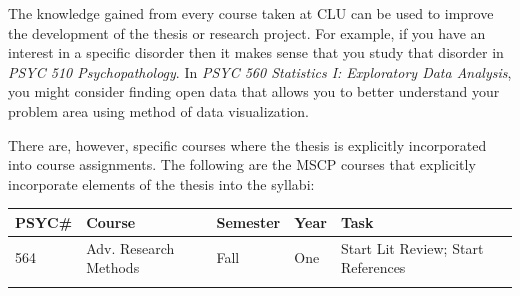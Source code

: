 \documentclass[
  openany]{book}
\begin{document}
The knowledge gained from every course taken at CLU can be used to improve the development of the thesis or research project. For example, if you have an interest in a specific disorder then it makes sense that you study that disorder in \emph{PSYC 510 Psychopathology}. In \emph{PSYC 560 Statistics I: Exploratory Data Analysis}, you might consider finding open data that allows you to better understand your problem area using method of data visualization.

There are, however, specific courses where the thesis is explicitly incorporated into course assignments. The following are the MSCP courses that explicitly incorporate elements of the thesis into the syllabi:

\begin{longtable}[]{@{}lllll@{}}
\toprule
\begin{minipage}[b]{0.03\columnwidth}\raggedright
PSYC\#\strut
\end{minipage} & \begin{minipage}[b]{0.27\columnwidth}\raggedright
Course\strut
\end{minipage} & \begin{minipage}[b]{0.26\columnwidth}\raggedright
Semester\strut
\end{minipage} & \begin{minipage}[b]{0.10\columnwidth}\raggedright
Year\strut
\end{minipage} & \begin{minipage}[b]{0.19\columnwidth}\raggedright
Task\strut
\end{minipage}\tabularnewline
\midrule
\endhead
\begin{minipage}[t]{0.03\columnwidth}\raggedright
564\strut
\end{minipage} & \begin{minipage}[t]{0.27\columnwidth}\raggedright
Adv. Research Methods\strut
\end{minipage} & \begin{minipage}[t]{0.26\columnwidth}\raggedright
Fall\strut
\end{minipage} & \begin{minipage}[t]{0.10\columnwidth}\raggedright
One\strut
\end{minipage} & \begin{minipage}[t]{0.19\columnwidth}\raggedright
Start Lit Review; Start References\strut
\end{minipage}\tabularnewline
\begin{minipage}[t]{0.03\columnwidth}\raggedright

\end{minipage}
\end{longtable}
\end{document}
